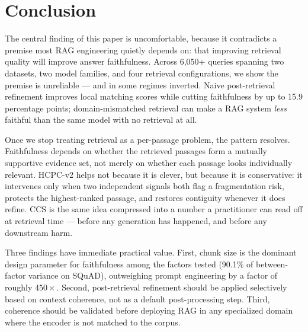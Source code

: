 \section{Conclusion}
\label{sec:conclusion}

The central finding of this paper is uncomfortable, because it
contradicts a premise most RAG engineering quietly depends on: that
improving retrieval quality will improve answer faithfulness. Across
6{,}050+ queries spanning two datasets, two model families, and four
retrieval configurations, we show the premise is unreliable — and in
some regimes inverted. Naive post-retrieval refinement improves local
matching scores while cutting faithfulness by up to 15.9 percentage
points; domain-mismatched retrieval can make a RAG system \emph{less}
faithful than the same model with no retrieval at all.

Once we stop treating retrieval as a per-passage problem, the pattern
resolves. Faithfulness depends on whether the retrieved passages form
a mutually supportive evidence set, not merely on whether each passage
looks individually relevant. HCPC-v2 helps not because it is clever,
but because it is conservative: it intervenes only when two independent
signals both flag a fragmentation risk, protects the highest-ranked
passage, and restores contiguity whenever it does refine. CCS is the
same idea compressed into a number a practitioner can read off at
retrieval time — before any generation has happened, and before any
downstream harm.

Three findings have immediate practical value. First, chunk size is the
dominant design parameter for faithfulness among the factors tested
(90.1\% of between-factor variance on SQuAD), outweighing prompt
engineering by a factor of roughly $450\times$. Second, post-retrieval
refinement should be applied selectively based on context coherence,
not as a default post-processing step. Third, coherence should be
validated before deploying RAG in any specialized domain where the
encoder is not matched to the corpus.

